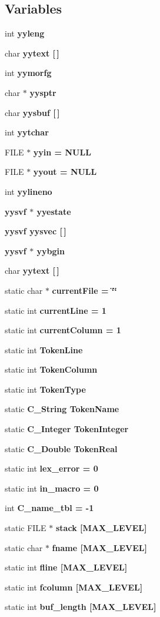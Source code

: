 \subsection*{Variables}
\begin{CompactItemize}
\item 
int \bf{yyleng}
\item 
char \bf{yytext} [$\,$]
\item 
int \bf{yymorfg}
\item 
char $\ast$ \bf{yysptr}
\item 
char \bf{yysbuf} [$\,$]
\item 
int \bf{yytchar}
\item 
FILE $\ast$ \bf{yyin} = NULL
\item 
FILE $\ast$ \bf{yyout} = NULL
\item 
int \bf{yylineno}
\item 
\bf{yysvf} $\ast$ \bf{yyestate}
\item 
\bf{yysvf} \bf{yysvec} [$\,$]
\item 
\bf{yysvf} $\ast$ \bf{yybgin}
\item 
char \bf{yytext} [$\,$]
\item 
static char $\ast$ \bf{current\-File} = \char`\"{}\char`\"{}
\item 
static int \bf{current\-Line} = 1
\item 
static int \bf{current\-Column} = 1
\item 
static int \bf{Token\-Line}
\item 
static int \bf{Token\-Column}
\item 
static int \bf{Token\-Type}
\item 
static \bf{C\_\-String} \bf{Token\-Name}
\item 
static \bf{C\_\-Integer} \bf{Token\-Integer}
\item 
static \bf{C\_\-Double} \bf{Token\-Real}
\item 
static int \bf{lex\_\-error} = 0
\item 
static int \bf{in\_\-macro} = 0
\item 
int \bf{C\_\-name\_\-tbl} = -1
\item 
static FILE $\ast$ \bf{stack} [MAX\_\-LEVEL]
\item 
static char $\ast$ \bf{fname} [MAX\_\-LEVEL]
\item 
static int \bf{fline} [MAX\_\-LEVEL]
\item 
static int \bf{fcolumn} [MAX\_\-LEVEL]
\item 
static int \bf{buf\_\-length} [MAX\_\-LEVEL]

\end{CompactItemize}
